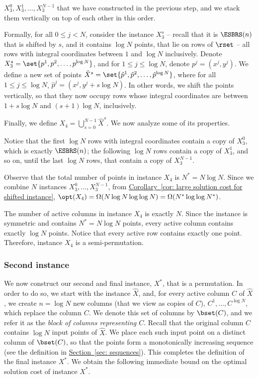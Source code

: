 \documentclass[11pt]{article}
\numberwithin{equation}{section}
\theoremstyle{definition}
\theoremstyle{plain}
\newcommand{\expref}[2]{\hyperref[#2]{#1~\ref{#2}}}
\begin{document}
$X^0_3,X^1_3,\ldots,X^{N-1}_3$ that we have constructed in the previous step, and we stack them vertically on top of each other in this order. 

Formally, for all $0\leq j< N$, consider the instance $X^s_3$ -- recall that it is $\ESBRS(n)$ that is shifted by $s$, and it contains $\log N$ points, that lie on rows of $\rset$ -- all rows with integral coordinates between $1$ and $\log N$ inclusively.
Denote $X^s_3=\set{p^1,p^2,\ldots,p^{\log N}}$, and for $1\leq j\leq \log N$, denote $p^j=(x^j,y^j)$. We define a new set of points $\hat X^s=\set{\hat p^1,\hat p^2,\ldots,\hat p^{\log N}}$, where for all $1\leq j\leq \log N$, $\hat p^j=(x^j,y^j+s\log N)$. In other words, we shift the points vertically, so that they now occupy rows whose integral coordinates are between $1+s\log N$ and $(s+1)\log N$, inclusively.

Finally, we define $X_4=\bigcup_{s=0}^{N-1}\hat X^s$. We now analyze some of its properties.

Notice that the first $\log N$ rows with integral coordinates contain a copy of $X^0_3$, which is exactly $\ESBRS(n)$; the following $\log N$ rows contain a copy of $X^1_3$, and so on, until the last $\log N$ rows, that contain a copy of $X^{N-1}_3$.

Observe that the total number of points in instance $X_4$ is $N^*=N\log N$. Since we combine $N$ instances $X^0_3,\ldots,X^{N-1}_3$, from \expref{Corollary}{cor: large solution cost for shifted instance}, $\opt(X_4)=\Omega(N\log N\log\log N)=\Omega(N^*\log\log N^*)$. 

The number of active columns in instance $X_4$ is exactly $N$. Since the instance is symmetric and contains $N^*=N\log N$ points, every active column contains exactly $\log N$ points. Notice that every active row contains exactly one point. Therefore, instance $X_4$ is a semi-permutation.
\fi 



%
%
%
%
%
%
%
\subsubsection{Second instance}


We now construct our second and final instance, $X^*$, that is a permutation. 
In order to do so, we start with the instance $\hat{X}$, and, for every active column $C$ of $\hat{X}$, we create $n= \log N$ new columns (that we view as copies of $C$), $C^1,\ldots,C^{\log N}$, which replace the column $C$. 
We denote this set of columns by $\bset(C)$, and we refer it as the \emph{block of columns representing $C$}. 
Recall that the original column $C$ contains $\log N$ input points of $\hat{X}$. 
We place each such input point on a distinct column of $\bset(C)$, so that the points form a monotonically increasing sequence (see the definition in \expref{Section}{sec: sequences}). This completes the definition of the final instance $X^*$.
%
We obtain the following immediate bound on the optimal solution cost of instance $X^*$.
\end{document}
